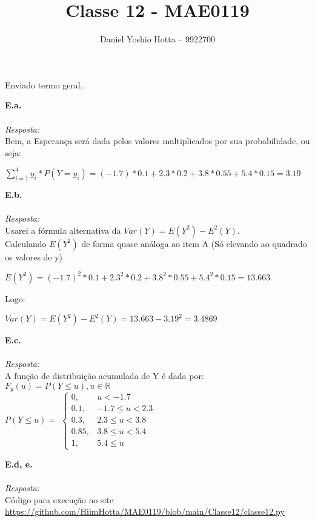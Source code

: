 \documentclass{article}
\begin{document}
	
	\title{Classe 12 - MAE0119}
	\author{Daniel Yoshio Hotta – 9922700}
	
	\maketitle	
	
		Enviado termo geral.
	
	\textbf {E.a.} 
	\\ \\
	\textit {Resposta:} \\
    
    Bem, a Esperança será dada pelos valores multiplicados por sua probabilidade, ou seja:
    
    \begin{center}
    	$\sum_{i = 1}^{4} y_i * P(Y = y_i) = (-1.7) * 0.1 + 2.3 * 0.2 + 3.8 * 0.55 + 5.4 * 0.15 = 3.19$\\
    \end{center}
    
    \textbf {E.b.} 
    \\ \\
    \textit {Resposta:} \\
    
    Usarei a fórmula alternativa da $Var(Y) = E(Y^2) - E^2(Y)$.\\
    
    Calculando $E(Y^2)$ de forma quase análoga ao item A (Só elevando ao quadrado os valores de y)
    
    \begin{center}
    	$E(Y^2) = (-1.7)^2 * 0.1 + 2.3^2 * 0.2 + 3.8^2 * 0.55 + 5.4^2 * 0.15 = 13.663$
    \end{center}

    Logo:
    
    \begin{center}
    	$Var(Y) = E(Y^2) - E^2(Y) = 13.663 - 3.19^2 = 3.4869$
    \end{center}
    
    \textbf {E.c.} 
    \\ \\
    \textit {Resposta:} \\
    
    A função de distribuição acumulada de Y é dada por: \\
    
    $F_y(u) = P(Y \leq u), u\in \mathbb{R}$\\
    
    $P(Y \leq u) = $
    $
    \begin{cases}
        0,   &u < -1.7\\
        0.1, & -1.7 \leq u < 2.3\\
        0.3, &  2.3 \leq u < 3.8\\
        0.85,&  3.8 \leq u < 5.4\\
        1,   &  5.4 \leq u
    \end{cases}
	$
	
	    
	\textbf {E.d, e.} 
	\\ \\
	\textit {Resposta:} \\
	
	Código para execução no site \url{https://github.com/HiimHotta/MAE0119/blob/main/Classe12/classe12.py}
	
	
	
\end{document}
